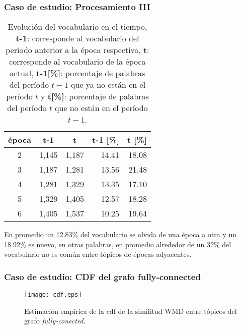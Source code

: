 \documentclass[
	spanish, %
	aspectratio=43, %
	hyperref={pdfencoding=auto,psdextra},
	xcolor={dvipsnames,table,usenames},
]{beamer}
\begin{document}
\begin{frame}[t]
\frametitle{Caso de estudio: Procesamiento III}
\begin{table}[H]
  \begin{tabular}{|c|r|r|r|r|}
  \hline
  \textbf{época} & \multicolumn{1}{c|}{\textbf{t-1}} & \multicolumn{1}{c|}{\textbf{t}} & \multicolumn{1}{c|}{\textbf{t-1 {[}\%{]}}} & \multicolumn{1}{l|}{\textbf{t {[}\%{]}}} \\ \hline
  2              & 1,145                              & 1,187                            & 14.41                                      & 18.08                                    \\ \hline
  3              & 1,187                              & 1,281                            & 13.56                                      & 21.48                                    \\ \hline
  4              & 1,281                              & 1,329                            & 13.35                                      & 17.10                                    \\ \hline
  5              & 1,329                              & 1,405                            & 12.57                                      & 18.28                                    \\ \hline
  6              & 1,405                              & 1,537                            & 10.25                                      & 19.64                                    \\ \hline
  \end{tabular}
  \caption{Evolución del vocabulario en el tiempo, \textbf{t-1}: corresponde al vocabulario del período anterior a la época respectiva, \textbf{t}: corresponde al vocabulario de la época actual, \textbf{t-1[\%]}: porcentaje de palabras del período $t-1$ que ya no están en el período $t$ y \textbf{t[\%]}: porcentaje de palabras del período $t$ que no están en el período $t-1$.}
\end{table}

En promedio un 12.83\% del vocabulario se olvida de una época a otra y un 18.92\% es nuevo, en otras palabras, en promedio alrededor de un 32\% del vocabulario no es común entre tópicos de épocas adyacentes. 

\end{frame}



\begin{frame}[t]
\frametitle{Caso de estudio: CDF del grafo fully-connected}

\begin{figure}
\texttt{[image: cdf.eps]}
\caption{Estimación empírica de la cdf de la similitud WMD entre tópicos del grafo \textit{fully-conected}.}
\label{img:cdf_wmd}
\end{figure}

\end{frame}
\end{document}
